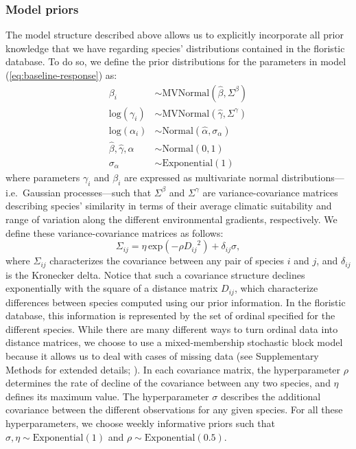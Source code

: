 \documentclass[11pt, a4paper]{article}
\begin{document}
\subsubsection*{Model priors}
The model structure described above allows us to explicitly incorporate all prior knowledge that we have regarding species' distributions contained in the floristic database. To do so, we define the prior distributions for the parameters in model (\ref{eq:baseline-response}) as:
\begin{equation} 
\begin{split}
\beta_{i}  & \sim \text{MVNormal}\left(\hat{\beta}, \Sigma^{\beta}\right)\\
\text{log}(\gamma_{i})  & \sim \text{MVNormal}\left(\hat{\gamma}, \Sigma^{\gamma}\right)\\
\text{log}(\alpha_{i}) & \sim \text{Normal}\left(\hat{\alpha}, \sigma_{\alpha}\right)\\
\hat{\beta}, 
\hat{\gamma}, 
\hat{\alpha}  & \sim \text{Normal}\left(0,1\right)\\
\sigma_{\alpha}  & \sim \text{Exponential}\left(1\right)
\end{split}
\label{eq:baseline-priors}
\end{equation} 
where parameters $\gamma_i$ and $\beta_i$ are expressed as multivariate normal distributions---i.e.~Gaussian processes---such that $\Sigma^{\beta}$ and $\Sigma^{\gamma}$ are variance-covariance matrices describing species' similarity in terms of their average climatic suitability and range of variation along the different environmental gradients, respectively. We define these variance-covariance matrices as follows:
\begin{equation} 
\Sigma_{ij} = \eta\,\text{exp}\left(-\rho {D_{ij}}^2\right) + \delta_{ij} \sigma ,
\label{eq:covariance-baseline}
\end{equation}
where $\Sigma_{ij}$ characterizes the covariance between any pair of species $i$ and $j$, and $\delta_{ij}$ is the Kronecker delta. Notice that such a covariance structure declines exponentially with the square of a distance matrix $D_{ij}$, which characterize differences between species computed using our prior information. In the floristic database, this information is represented by the set of ordinal specified for the different species. While there are many different ways to turn ordinal data into distance matrices, we choose to use a mixed-membership stochastic block model because it allows us to deal with cases of missing data (see Supplementary Methods for extended details; \citealt{godoy-loriteAccurateScalableSocial2016}). In each covariance matrix, the hyperparameter $\rho$ determines the rate of decline of the covariance between any two species, and $\eta$ defines its maximum value. The hyperparameter $\sigma$ describes the additional covariance between the different observations for any given species. For all these hyperparameters, we choose weekly informative priors such that $\sigma , \eta \sim \text{Exponential}\left(1\right)$ and $\rho\sim \text{Exponential}\left(0.5\right)$.
\end{document}
